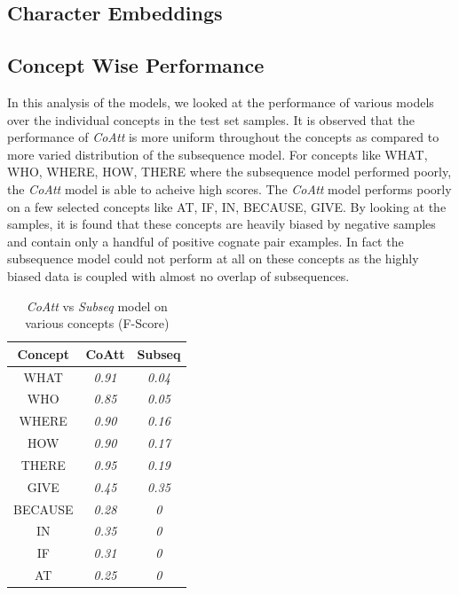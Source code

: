 \documentclass[11pt,letterpaper]{article}
\begin{document}
\subsection{Character Embeddings}

\subsection{Concept Wise Performance}

In this analysis of the models, we looked at the performance of various models over the individual concepts in the test set samples. It is observed that the performance of \textit{CoAtt} is more uniform throughout the concepts as compared to more varied distribution of the subsequence model. For concepts like WHAT, WHO, WHERE, HOW, THERE where the subsequence model performed poorly, the \textit{CoAtt} model is able to acheive high scores. The \textit{CoAtt} model performs poorly on a few selected concepts like AT, IF, IN, BECAUSE, GIVE. By looking at the samples, it is found that these concepts are heavily biased by negative samples and contain only a handful of positive cognate pair examples. In fact the subsequence model could not perform at all on these concepts as the highly biased data is coupled with almost no overlap of subsequences.

\begin{table}[h]
\centering
\begin{tabular}{ccc}
\textbf{Concept} & \textbf{CoAtt} & \textbf{Subseq} \\ \hline
WHAT             & \textit{0.91}  & \textit{0.04}   \\
WHO              & \textit{0.85}  & \textit{0.05}   \\
WHERE            & \textit{0.90}  & \textit{0.16}   \\
HOW              & \textit{0.90}  & \textit{0.17}   \\
THERE            & \textit{0.95}  & \textit{0.19}  \\
GIVE             & \textit{0.45}  & \textit{0.35}  \\
BECAUSE          & \textit{0.28}  & \textit{0}      \\
IN               & \textit{0.35}  & \textit{0}      \\
IF               & \textit{0.31}  & \textit{0}      \\
AT               & \textit{0.25}  & \textit{0}      
\end{tabular}
\caption{\textit{CoAtt} vs \textit{Subseq} model on various concepts (F-Score)}
\end{table}
\end{document}
